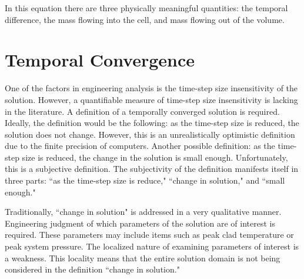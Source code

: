 In this equation there are three physically meaningful quantities: the temporal difference, the mass flowing into the cell, and mass flowing out of the volume. 


\section{Temporal Convergence}
\label{sect:temporal_convergence}

One of the factors in engineering analysis is the time-step size insensitivity of the solution.
However, a quantifiable measure of time-step size insensitivity is lacking in the literature.
A definition of a temporally converged solution is required.
Ideally, the definition would be the following: as the time-step size is reduced, the solution does not change.
However, this is an unrealistically optimistic definition due to the finite precision of computers.
Another possible definition: as the time-step size is reduced, the change in the solution is small enough.
Unfortunately, this is a subjective definition.
The subjectivity of the definition manifests itself in three parts: ``as the time-step size is reduce," ``change in solution," and ``small enough."

Traditionally, ``change in solution" is addressed in a very qualitative manner.
Engineering judgment of which parameters of the solution are of interest is required.
These parameters may include items such as peak clad temperature or peak system pressure.
The localized nature of examining parameters of interest is a weakness.
This locality means that the entire solution domain is not being considered in the definition ``change in solution."

